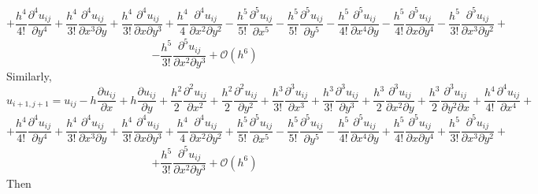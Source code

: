 \documentclass{article}
\begin{document}
\[ + \frac{h^4}{4!}\frac{\partial^4 u_{ij}}{\partial y^4} + \frac{h^4}{3!}\frac{\partial^4 u_{ij}}{\partial x^3 \partial y} + \frac{h^4}{3!}\frac{\partial^4 u_{ij}}{\partial x \partial y^3} + \frac{h^4}{4}\frac{\partial^4 u_{ij}}{\partial x^2 \partial y^2} - \frac{h^5}{5!}\frac{\partial^5 u_{ij}}{\partial x^5} - \frac{h^5}{5!}\frac{\partial^5 u_{ij}}{\partial y^5} - \frac{h^5}{4!}\frac{\partial^5 u_{ij}}{\partial x^4\partial y} - \frac{h^5}{4!}\frac{\partial^5 u_{ij}}{\partial x\partial y^4} - \frac{h^5}{3!}\frac{\partial^5 u_{ij}}{\partial x^3 \partial y^2} + \]
\[ - \frac{h^5}{3!}\frac{\partial^5 u_{ij}}{\partial x^2 \partial y^3} + \mathcal{O}(h^6)\]
Similarly,
\[u_{i+1,j+1} = u_{ij} - h\frac{\partial u_{ij}}{\partial x} + h\frac{\partial u_{ij}}{\partial y} + \frac{h^2}{2}\frac{\partial^2 u_{ij}}{\partial x^2} + \frac{h^2}{2}\frac{\partial^2 u_{ij}}{\partial y^2} + \frac{h^3}{3!}\frac{\partial^3 u_{ij}}{\partial x^3} + \frac{h^3}{3!}\frac{\partial^3 u_{ij}}{\partial y^3} + \frac{h^3}{2}\frac{\partial^3 u_{ij}}{\partial x^2 \partial y} + \frac{h^3}{2}\frac{\partial^3 u_{ij}}{\partial y^2 \partial x} + \frac{h^4}{4!}\frac{\partial^4 u_{ij}}{\partial x^4} + \]
\[ + \frac{h^4}{4!}\frac{\partial^4 u_{ij}}{\partial y^4} + \frac{h^4}{3!}\frac{\partial^4 u_{ij}}{\partial x^3 \partial y} + \frac{h^4}{3!}\frac{\partial^4 u_{ij}}{\partial x \partial y^3} + \frac{h^4}{4}\frac{\partial^4 u_{ij}}{\partial x^2 \partial y^2} + \frac{h^5}{5!}\frac{\partial^5 u_{ij}}{\partial x^5} - \frac{h^5}{5!}\frac{\partial^5 u_{ij}}{\partial y^5} - \frac{h^5}{4!}\frac{\partial^5 u_{ij}}{\partial x^4\partial y} + \frac{h^5}{4!}\frac{\partial^5 u_{ij}}{\partial x\partial y^4} + \frac{h^5}{3!}\frac{\partial^5 u_{ij}}{\partial x^3 \partial y^2} + \]
\[ + \frac{h^5}{3!}\frac{\partial^5 u_{ij}}{\partial x^2 \partial y^3} + \mathcal{O}(h^6)\]
Then
\end{document}
